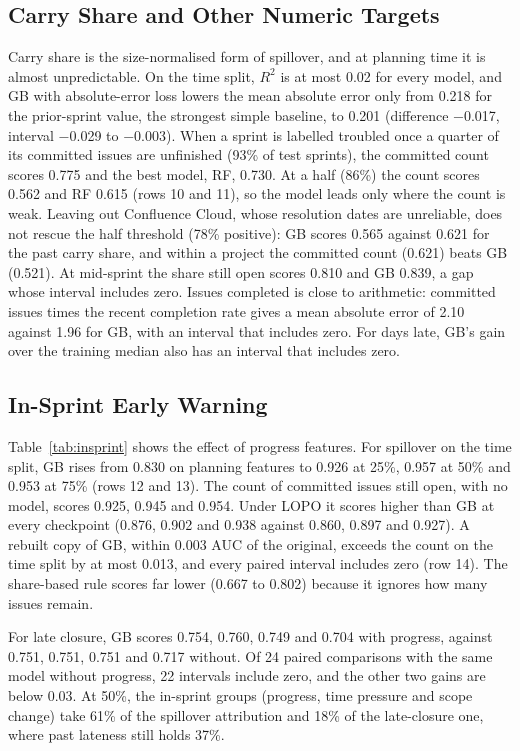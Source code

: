 \documentclass[conference]{IEEEtran}
\begin{document}
\subsection{Carry Share and Other Numeric Targets}
\label{sec:num}

Carry share is the size-normalised form of spillover, and at planning time it is almost unpredictable. On the time split, $R^2$ is at most 0.02 for every model, and GB with absolute-error loss lowers the mean absolute error only from 0.218 for the prior-sprint value, the strongest simple baseline, to 0.201 (difference $-$0.017, interval $-$0.029 to $-$0.003). When a sprint is labelled troubled once a quarter of its committed issues are unfinished (93\% of test sprints), the committed count scores 0.775 and the best model, RF, 0.730. At a half (86\%) the count scores 0.562 and RF 0.615 (rows 10 and 11), so the model leads only where the count is weak. Leaving out Confluence Cloud, whose resolution dates are unreliable, does not rescue the half threshold (78\% positive): GB scores 0.565 against 0.621 for the past carry share, and within a project the committed count (0.621) beats GB (0.521). At mid-sprint the share still open scores 0.810 and GB 0.839, a gap whose interval includes zero. Issues completed is close to arithmetic: committed issues times the recent completion rate gives a mean absolute error of 2.10 against 1.96 for GB, with an interval that includes zero. For days late, GB's gain over the training median also has an interval that includes zero.

\subsection{In-Sprint Early Warning}

Table~\ref{tab:insprint} shows the effect of progress features. For spillover on the time split, GB rises from 0.830 on planning features to 0.926 at 25\%, 0.957 at 50\% and 0.953 at 75\% (rows 12 and 13). The count of committed issues still open, with no model, scores 0.925, 0.945 and 0.954. Under LOPO it scores higher than GB at every checkpoint (0.876, 0.902 and 0.938 against 0.860, 0.897 and 0.927). A rebuilt copy of GB, within 0.003 AUC of the original, exceeds the count on the time split by at most 0.013, and every paired interval includes zero (row 14). The share-based rule scores far lower (0.667 to 0.802) because it ignores how many issues remain.

For late closure, GB scores 0.754, 0.760, 0.749 and 0.704 with progress, against 0.751, 0.751, 0.751 and 0.717 without. Of 24 paired comparisons with the same model without progress, 22 intervals include zero, and the other two gains are below 0.03. At 50\%, the in-sprint groups (progress, time pressure and scope change) take 61\% of the spillover attribution and 18\% of the late-closure one, where past lateness still holds 37\%.
\end{document}
